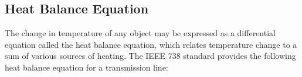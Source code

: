 \documentclass[journal,twoside]{IEEEtran}
\begin{document}
%





\subsection{Heat Balance Equation}
The change in temperature of any object may be expressed as a differential equation called the heat balance equation, which relates temperature change to a sum of various sources of heating. The IEEE 738 standard \cite{ieee2013} provides the following heat balance equation for a transmission line:
\end{document}
